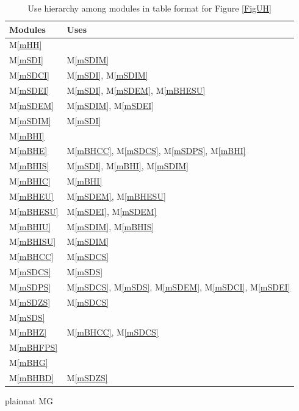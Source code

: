 \documentclass[12pt, titlepage]{article}
\newcommand{\mref}[1]{M\ref{#1}}
\begin{document}
\begin{table}[H]
\centering
\begin{tabular}{p{} p{}}
\toprule
\textbf{Modules} & \textbf{Uses}\\
\midrule
\mref{mHH} & ~\\
\mref{mSDI} & \mref{mSDIM}\\
\mref{mSDCI} & \mref{mSDI}, \mref{mSDIM}\\
\mref{mSDEI} & \mref{mSDI}, \mref{mSDEM}, \mref{mBHESU}\\
\mref{mSDEM} & \mref{mSDIM}, \mref{mSDEI}\\
\mref{mSDIM} & \mref{mSDI}\\
\mref{mBHI} & ~\\
\mref{mBHE} & \mref{mBHCC}, \mref{mSDCS}, \mref{mSDPS}, \mref{mBHI}\\
\mref{mBHIS} & \mref{mSDI}, \mref{mBHI}, \mref{mSDIM}\\
\mref{mBHIC} & \mref{mBHI}\\
\mref{mBHEU} & \mref{mSDEM}, \mref{mBHESU}\\
\mref{mBHESU} & \mref{mSDEI}, \mref{mSDEM}\\
\mref{mBHIU} & \mref{mSDIM}, \mref{mBHIS}\\
\mref{mBHISU} & \mref{mSDIM}\\
\mref{mBHCC} & \mref{mSDCS}\\
\mref{mSDCS} & \mref{mSDS}\\
\mref{mSDPS} & \mref{mSDCS}, \mref{mSDS}, \mref{mSDEM}, \mref{mSDCI}, \mref{mSDEI}\\
\mref{mSDZS} & \mref{mSDCS}\\
\mref{mSDS} & ~\\
\mref{mBHZ} & \mref{mBHCC}, \mref{mSDCS}\\
\mref{mBHFPS} & ~\\
\mref{mBHG} & ~\\
\mref{mBHBD} & \mref{mSDZS}\\
\bottomrule
\end{tabular}
\caption{Use hierarchy among modules in table format for Figure \ref{FigUH}}
\label{TblACT}
\end{table}


 {plainnat}
 {MG}
\end{document}
